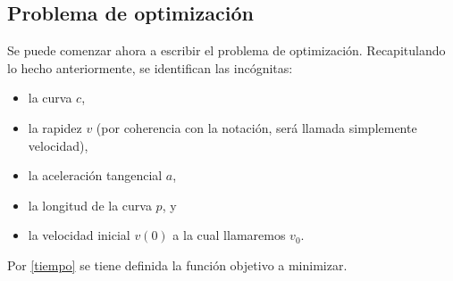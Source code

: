 \documentclass[a4paper,10pt]{book}
\begin{document}

 


\subsection{Problema de optimización}
Se puede comenzar ahora a escribir el problema de optimización.
Recapitulando lo hecho anteriormente, se identifican las incógnitas:
\begin{itemize}
 \item la curva $c$,
 \item la rapidez $v$ (por coherencia con la notación, será llamada simplemente velocidad),
 \item la aceleración tangencial $a$,
 \item la longitud de la curva $p$, y
 \item la velocidad inicial $v(0)$ a la cual llamaremos $v_0$.
\end{itemize}

Por \eqref{tiempo} se tiene definida la función objetivo a minimizar.
\end{document}
